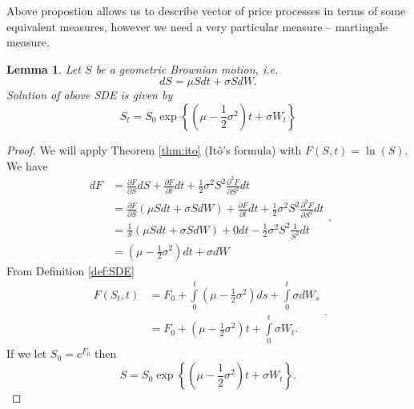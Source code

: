 \documentclass[a4paper,12pt, oneside]{book}
\newtheorem{lemma}[thm]{Lemma}
\theoremstyle{definition}
\theoremstyle{remark}
\begin{document}
Above propostion allows us to describe vector of price processes in terms of some equivalent measures, however we need a very particular measure -- martingale measure.
\begin{lemma}
\label{lemma:solution_dynamics}
 Let $S$ be a geometric Brownian motion, i.e.
 \[ dS = \mu S dt + \sigma S dW. \]
 Solution of above SDE is given by
 \begin{equation}
  \label{eq:gmb_sol}
  S_t = S_0 \exp\left\{ (\mu - \frac{1}{2}\sigma^2)t + \sigma W_t \right\}
 \end{equation}
\end{lemma}
\begin{proof}
We will apply Theorem \ref{thm:ito} (It\^{o}'s formula) with $F(S,t) = \ln(S)$. We have
 \begin{equation*}
  \begin{split}
   dF &= \frac{\partial F}{\partial S}dS + \frac{\partial F}{\partial t}dt + \frac{1}{2}\sigma^2 S^2 \frac{\partial^2 F}{\partial S^2}dt \\
   &= \frac{\partial F}{\partial S}(\mu S dt + \sigma S dW) + \frac{\partial F}{\partial t}dt + \frac{1}{2}\sigma^2 S^2 \frac{\partial^2 F}{\partial S^2}dt \\    
   &= \frac{1}{S}(\mu S dt + \sigma S dW) + 0dt - \frac{1}{2}\sigma^2 S^2 \frac{1}{S^2}dt \\   
   &= (\mu - \frac{1}{2}\sigma^2) dt + \sigma dW
  \end{split}.
 \end{equation*}
 From Definition \ref{def:SDE}
 \begin{equation*}
  \begin{split}
  F(S_t,t) &= F_0 + \int\limits_0^t (\mu - \frac{1}{2}\sigma^2) ds + \int\limits_0^t \sigma dW_s\\
  &= F_0 + (\mu - \frac{1}{2}\sigma^2)t + \int\limits_0^t \sigma W_t. 
  \end{split}.
 \end{equation*}
 If we let $S_0 = e^{F_0}$ then
 \[ S = S_0 \exp\left\{ (\mu - \frac{1}{2}\sigma^2)t + \sigma W_t \right\}. \] 
\end{proof}
\end{document}
